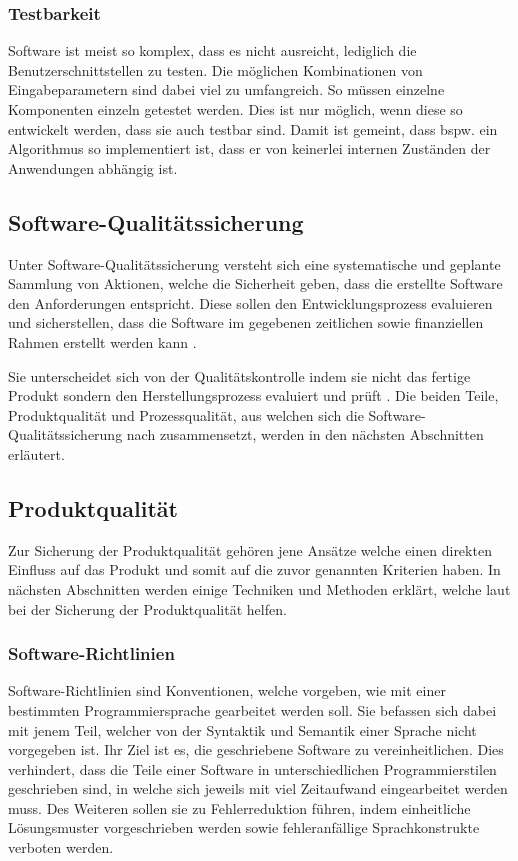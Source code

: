\subsubsection{Testbarkeit}\label{testability}
Software ist meist so komplex, dass es nicht ausreicht, lediglich die Benutzerschnittstellen zu testen.
Die möglichen Kombinationen von Eingabeparametern sind dabei viel zu umfangreich.
So müssen einzelne Komponenten einzeln getestet werden.
Dies ist nur möglich, wenn diese so entwickelt werden, dass sie auch testbar sind.
Damit ist gemeint, dass bspw. ein Algorithmus so implementiert ist, dass er von keinerlei internen Zuständen der Anwendungen abhängig ist. 


\subsection{Software-Qualitätssicherung}\label{qualisicherung}
Unter Software-Qualitätssicherung versteht sich eine systematische und geplante Sammlung von Aktionen, 
welche die Sicherheit geben, dass die erstellte Software den Anforderungen entspricht.
Diese sollen den Entwicklungsprozess evaluieren und sicherstellen,
dass die Software im gegebenen zeitlichen sowie finanziellen Rahmen erstellt werden kann \parencite{galin2004software}. 

Sie unterscheidet sich von der Qualitätskontrolle indem sie nicht das fertige Produkt sondern den Herstellungsprozess evaluiert und prüft \parencite{galin2004software}.
Die beiden Teile, Produktqualität und Prozessqualität, aus welchen sich die Software-Qualitätssicherung nach \citeauthor{hoffmann2013software} zusammensetzt, werden in den nächsten Abschnitten erläutert.

\subsection{Produktqualität}
Zur Sicherung der Produktqualität gehören jene Ansätze welche einen direkten Einfluss auf das Produkt und somit auf die zuvor genannten Kriterien haben.
In nächsten Abschnitten werden einige Techniken und Methoden erklärt, welche laut \citeauthor{hoffmann2013software} bei der Sicherung der Produktqualität helfen.

\subsubsection{Software-Richtlinien}\label{quality_richtline}
Software-Richtlinien sind Konventionen, welche vorgeben, wie mit einer bestimmten Programmiersprache gearbeitet werden soll.
Sie befassen sich dabei mit jenem Teil, welcher von der Syntaktik und Semantik einer Sprache nicht vorgegeben ist.
Ihr Ziel ist es, die geschriebene Software zu vereinheitlichen.
Dies verhindert, dass die Teile einer Software in unterschiedlichen Programmierstilen geschrieben sind, in welche sich jeweils mit viel Zeitaufwand eingearbeitet werden muss.
Des Weiteren sollen sie zu Fehlerreduktion führen, indem einheitliche Lösungsmuster vorgeschrieben werden sowie fehleranfällige Sprachkonstrukte verboten werden.


